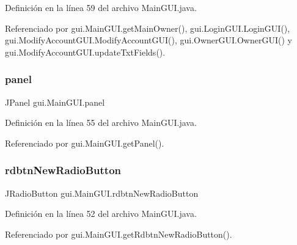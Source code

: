 Definición en la línea 59 del archivo Main\+G\+U\+I.\+java.



Referenciado por gui.\+Main\+G\+U\+I.\+get\+Main\+Owner(), gui.\+Login\+G\+U\+I.\+Login\+G\+U\+I(), gui.\+Modify\+Account\+G\+U\+I.\+Modify\+Account\+G\+U\+I(), gui.\+Owner\+G\+U\+I.\+Owner\+G\+U\+I() y gui.\+Modify\+Account\+G\+U\+I.\+update\+Txt\+Fields().

\mbox{\label{classgui_1_1_main_g_u_i_a0fee89799e637ac087877c50b36b8fbb}} 
\subsubsection{\texorpdfstring{panel}{panel}}
{\footnotesize\ttfamily J\+Panel gui.\+Main\+G\+U\+I.\+panel\hspace{0.3cm}{\ttfamily [private]}}



Definición en la línea 55 del archivo Main\+G\+U\+I.\+java.



Referenciado por gui.\+Main\+G\+U\+I.\+get\+Panel().

\mbox{\label{classgui_1_1_main_g_u_i_ac5a0c08593d1be1d14216cb694dd7941}} 
\subsubsection{\texorpdfstring{rdbtnNewRadioButton}{rdbtnNewRadioButton}}
{\footnotesize\ttfamily J\+Radio\+Button gui.\+Main\+G\+U\+I.\+rdbtn\+New\+Radio\+Button\hspace{0.3cm}{\ttfamily [private]}}



Definición en la línea 52 del archivo Main\+G\+U\+I.\+java.



Referenciado por gui.\+Main\+G\+U\+I.\+get\+Rdbtn\+New\+Radio\+Button().

\mbox{\label{classgui_1_1_main_g_u_i_a1aac1b64ce419c18765911c59fe88c19}} 
